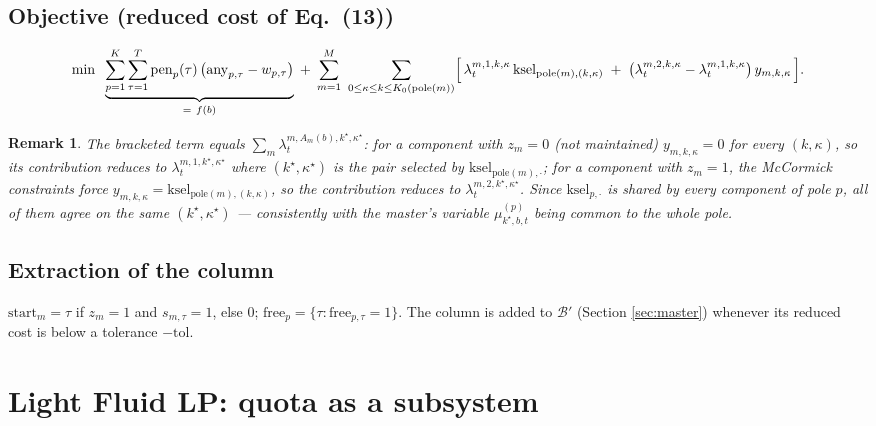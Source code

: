 \documentclass[11pt]{article}
\newtheorem{remark}{Remark}
\newcommand{\any}{\mathrm{any}}
\newcommand{\free}{\mathrm{free}}
\newcommand{\ksel}{\mathrm{ksel}}
\newcommand{\pole}{\mathrm{pole}}
\begin{document}
\subsection*{Objective (reduced cost of Eq.~(13))}
\[
  \min\;\; \underbrace{\sum_{p=1}^K \sum_{\tau=1}^T \mathrm{pen}_p(\tau)\,
      \bigl(\any_{p,\tau} - w_{p,\tau}\bigr)}_{=\ f(b)}
  \;+\;
  \sum_{m=1}^{M}\ \sum_{0 \le \kappa \le k \le K_0(\pole(m))}
    \Bigl[\, \lambda_t^{m,1,k,\kappa}\, \ksel_{\pole(m),(k,\kappa)}
    \;+\; \bigl(\lambda_t^{m,2,k,\kappa} - \lambda_t^{m,1,k,\kappa}\bigr)\, y_{m,k,\kappa} \,\Bigr].
\]
\begin{remark}
The bracketed term equals $\sum_m \lambda_t^{m,A_m(b),k^\star,\kappa^\star}$: for a
component with $z_m=0$ (not maintained) $y_{m,k,\kappa}=0$ for every $(k,\kappa)$, so its
contribution reduces to $\lambda_t^{m,1,k^\star,\kappa^\star}$ where $(k^\star,\kappa^\star)$
is the pair selected by $\ksel_{\pole(m),\cdot}$; for a component with $z_m=1$, the
McCormick constraints force $y_{m,k,\kappa}=\ksel_{\pole(m),(k,\kappa)}$, so the
contribution reduces to $\lambda_t^{m,2,k^\star,\kappa^\star}$. Since $\ksel_{p,\cdot}$ is
shared by every component of pole $p$, all of them agree on the same $(k^\star,\kappa^\star)$
--- consistently with the master's variable $\mu^{(p)}_{k^\star,b,t}$ being common to the
whole pole.
\end{remark}

\subsection*{Extraction of the column}
$\mathrm{start}_m = \tau$ if $z_m=1$ and $s_{m,\tau}=1$, else $0$; $\mathrm{free}_p =
\{\tau : \free_{p,\tau}=1\}$. The column is added to $\mathcal B'$ (Section
\ref{sec:master}) whenever its reduced cost is below a tolerance $-\mathrm{tol}$.

\section{Light Fluid LP: quota as a subsystem}
\label{sec:light}
\end{document}
